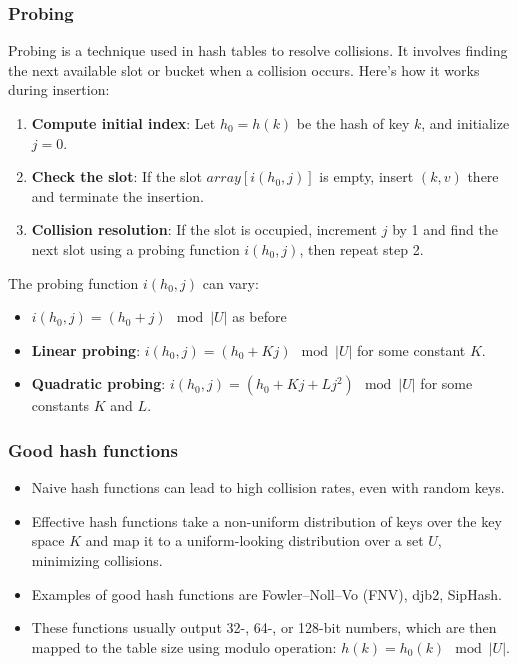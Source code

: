 \documentclass[12pt]{article}
\begin{document}
\subsubsection{Probing}

Probing is a technique used in hash tables to resolve collisions. It involves finding the next available slot or bucket when a collision occurs. Here's how it works during insertion:

\begin{enumerate}
    \item \textbf{Compute initial index}: Let \( h_0 = h(k) \) be the hash of key \( k \), and initialize \( j = 0 \).
    \item \textbf{Check the slot}: If the slot \( array[i(h_0, j)] \) is empty, insert \( (k, v) \) there and terminate the insertion.
    \item \textbf{Collision resolution}: If the slot is occupied, increment \( j \) by 1 and find the next slot using a probing function \( i(h_0, j) \), then repeat step 2.
\end{enumerate}

The probing function \( i(h_0, j) \) can vary:
\begin{itemize}
    \item \( i(h_0, j) = (h_0 + j) \mod |U| \) as before
    \item \textbf{Linear probing}: \( i(h_0, j) = (h_0 + Kj) \mod |U| \) for some constant $K$.
    \item \textbf{Quadratic probing}: \( i(h_0, j) = (h_0 + Kj + Lj^2) \mod |U| \) for some constants \( K \) and \( L \).
\end{itemize}


\subsubsection{Good hash functions}
\begin{itemize}
    \item Naive hash functions can lead to high collision rates, even with random keys.
    \item Effective hash functions take a non-uniform distribution of keys over the key space \( K \) and map it to a uniform-looking distribution over a set \( U \), minimizing collisions.
    \item Examples of good hash functions are Fowler–Noll–Vo (FNV), djb2, SipHash.
    \item These functions usually output 32-, 64-, or 128-bit numbers, which are then mapped to the table size using modulo operation: \( h(k) = h_0(k) \mod |U| \).
\end{itemize}
\end{document}
